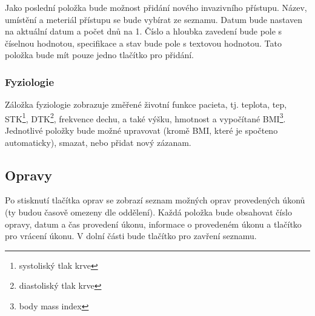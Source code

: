 Jako poslední položka bude možnost přidání nového invazivního přístupu. Název, umístění a meteriál přístupu se bude vybírat ze seznamu. Datum bude nastaven na aktuální datum a počet dnů na 1. Číslo a hloubka zavedení bude pole s číselnou hodnotou, specifikace a stav bude pole s textovou hodnotou. Tato položka bude mít pouze jedno tlačítko pro přidání.

\subsubsection{Fyziologie}

Záložka fyziologie zobrazuje změřené životní funkce pacieta, tj. teplota, tep, STK\footnote{systoliský tlak krve}, DTK\footnote{diastoliský tlak krve}, frekvence dechu, a také výšku, hmotnost a vypočítané BMI\footnote{body mass index}. Jednotlivé položky bude možné upravovat (kromě BMI, které je spočteno automaticky), smazat, nebo přidat nový zázanam.

\subsection{Opravy}

Po stisknutí tlačítka oprav se zobrazí seznam možných oprav provedených úkonů (ty budou časově omezeny dle oddělení). Každá položka bude obsahovat číslo opravy, datum a čas provedení úkonu, informace o provedeném úkonu a tlačítko pro vrácení úkonu. V dolní části bude tlačítko pro zavření seznamu.